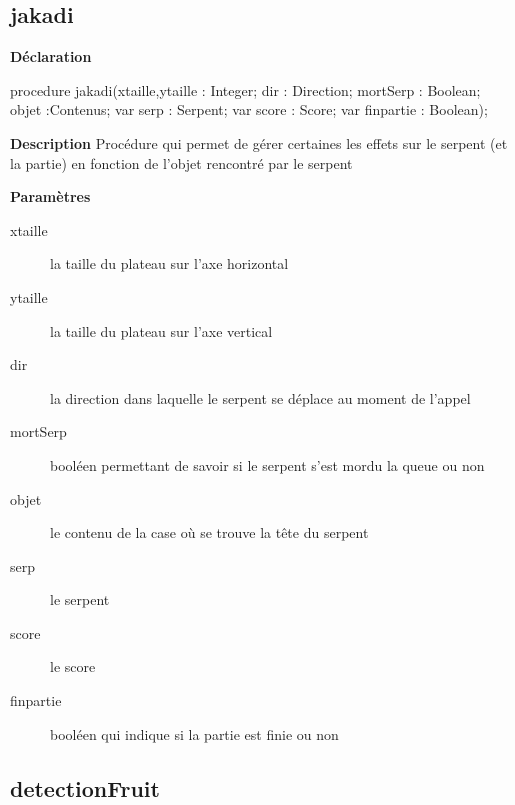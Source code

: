 \documentclass{report}
\newif\ifpdf
\begin{document}
\subsection*{jakadi}
\fi
\label{Jouer-jakadi}
\begin{list}{}{
\setlength{\itemindent}{0cm}
\setlength{\listparindent}{0cm}
\setlength{\leftmargin}{\evensidemargin}
\addtolength{\leftmargin}{\tmplength}
\settowidth{\labelsep}{X}
\addtolength{\leftmargin}{\labelsep}
\setlength{\labelwidth}{\tmplength}
}
\item[\textbf{Déclaration}\hfill]
\ifpdf
\begin{flushleft}
\fi
\begin{ttfamily}
procedure jakadi(xtaille,ytaille : Integer; dir : Direction; mortSerp : Boolean; objet :Contenus; var serp : Serpent; var score : Score; var finpartie : Boolean);\end{ttfamily}

\ifpdf
\end{flushleft}
\fi

\par
\item[\textbf{Description}]
Procédure qui permet de gérer certaines les effets sur le serpent (et la partie) en fonction de l'objet rencontré par le serpent        \par
\item[\textbf{Paramètres}]
\begin{description}
\item[xtaille] la taille du plateau sur l'axe horizontal
\item[ytaille] la taille du plateau sur l'axe vertical
\item[dir] la direction dans laquelle le serpent se déplace au moment de l'appel
\item[mortSerp] booléen permettant de savoir si le serpent s'est mordu la queue ou non
\item[objet] le contenu de la case où se trouve la tête du serpent
\item[serp] le serpent
\item[score] le score
\item[finpartie] booléen qui indique si la partie est finie ou non
\end{description}


\end{list}
\ifpdf
\subsection*{\large{\textbf{detectionFruit}}\normalsize\hspace{1ex}\hrulefill}
\else
\end{document}
